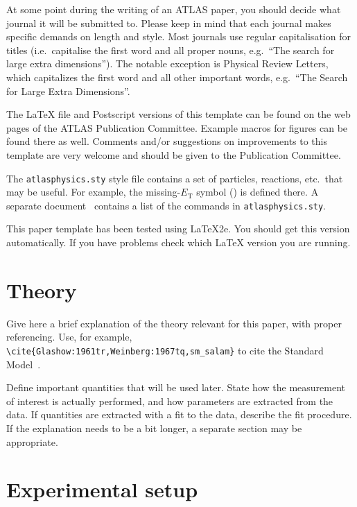 \documentclass[coverpage]{style/atlasdoc}
\begin{document}
At some point during the writing of an ATLAS paper, 
you should decide what journal it will be submitted to.
Please keep in mind that each journal makes specific demands on length and style.
Most journals use regular capitalisation for titles 
(i.e.\ capitalise the first word and all proper nouns, 
e.g.\ ``The search for large extra dimensions''). 
The notable exception is Physical Review Letters, which capitalizes the
first word and all other important words,
e.g.\ ``The Search for Large Extra Dimensions''.

The \LaTeX{} file and Postscript versions of this template can be
found on the web pages of the ATLAS Publication Committee. Example
macros for figures can be found there as well.  Comments and/or
suggestions on improvements to this template are very welcome and
should be given to the Publication Committee.

The \texttt{atlasphysics.sty} style file contains a set of particles,
reactions, etc.\ that may be useful. For example, the missing-$E_{\text{T}}$
symbol (\met{}) is defined there. 
A separate document~\cite{atlas-physics}
contains a list of the commands in \texttt{atlasphysics.sty}.

This paper template has been tested using \LaTeX{}2e.  You should get
this version automatically. If you have problems check which \LaTeX{}
version you are running.


\section{Theory}
\label{sec:theory}

Give here a brief explanation of the theory relevant for this paper,
with proper referencing. Use, for example,
\verb|\cite{Glashow:1961tr,Weinberg:1967tq,sm_salam}| to cite the
Standard Model~\cite{Glashow:1961tr,Weinberg:1967tq,sm_salam}.

Define important quantities that will be used later.
State how the measurement of interest is actually performed, and how parameters are
extracted from the data.  
If quantities are extracted with a fit to the data, describe the fit procedure.
If the explanation needs to be a bit longer, a separate section may be appropriate.


\section{Experimental setup}
\label{sec:atlas}
\end{document}
